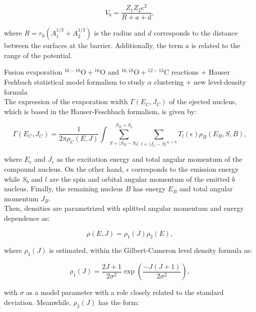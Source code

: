 \documentclass[openany]{book}
\begin{document}
\begin{equation}\label{eq:middleFusion_empirical_barrier_Parametrized}
	V_b = \frac{Z_1Z_2e^2}{R + a + d},
\end{equation}

where $R = r_0 (A^{1/3}_1 + A^{1/3}_2)$ is the radius and $d$ corresponds to the distance between the surfaces at the barrier. Additionally, the term $a$ is related to the range of the potential.


Fusion evaporation $\mathrm{{}^{16-18}O + {}^{16}O}$ and $\mathrm{{}^{16, 18}O+ {}^{12-13}C}$ reactions + Hauser Feshbach statistical model formalism to study $\alpha$ clustering + new level-density formula \cite{wang_ren_bai_2020} \\

The expression of the evaporation width $\Gamma(E_C, J_C)$ of the ejected nucleus, which is based in the Hauser-Feschbach formalism,  is given by: 

\begin{equation}\label{eq:middleFusion_evaporationWidth}
	\Gamma(E_C, J_C) = \frac{1}{2 \pi \rho_C(E, J)} \int \sum_{S = |S_B -S_b|}^{S_B + S_b} \sum_{l = |J_C - S|^{J_C+S}} {T_l(\epsilon) \rho_B(E_B, S, B)},
\end{equation}

where $E_c$ and $J_c$ as the excitation energy and total angular momentum of the compound nucleus. On the other hand, $\epsilon$ corresponds to the emission energy while $S_b$ and $l$ are the spin and orbital angular momentum of the emitted $b$ nucleus. Finally, the remaining nucleus $B$ has energy $E_B$ and total angular momentum $J_B$.\\

Then, densities are parametrized with splitted angular momentum and energy dependence as: 

\begin{equation}\label{eq:middleFusion_density}
	\rho(E, J) = \rho_1(J)\rho_2(E),
\end{equation}

where $\rho_1(J)$ is estimated, within the Gilbert-Cameron level density formula as:

\begin{equation}\label{eq:middleFusion_density_rhoJ}
	\rho_1(J) = \frac{2J + 1}{2\sigma^2} \exp {\left( \frac{- J(J+1)}{2\sigma^2}\right)},
\end{equation}

with $\sigma$ as a model parameter with a role closely related to the standard deviation. Meanwhile,  $\rho_2(J)$ has the form:
\end{document}
